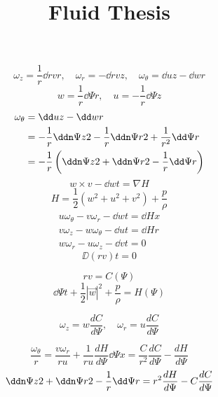 \documentclass{/home/janmebows/Documents/LatexTemplates/myassignment}
\title{Fluid Thesis}
\begin{document}
\[\omega_z = \frac1r \dd{rv}{r}, \quad \omega_r = -\dd{rv}{z},\quad \omega_\theta = \dd{u}{z} - \dd{w}{r}\]
\[w =\frac1r \dd\Psi{r} , \quad u=-\frac1r \dd\Psi{z}\]
\begin{align*}
    \omega_\theta &= \dd uz - \dd wr\\
    &= -\frac1r \ddn\Psi z2 - \frac1r \ddn \Psi r2 + \frac{1}{r^2} \dd\Psi r\\
    &= -\frac1r\left(\ddn\Psi z2 + \ddn \Psi r2 - \frac1r\dd\Psi r\right)
\end{align*}
\[w \times v - \dd wt = \nabla H\]
\[H = \frac12 (w^2 + u^2 + v^2) + \frac p\rho \]
\begin{align*}
    u\omega_\theta - v\omega_r - \dd wt = \dd Hx\\
    v \omega_z - w \omega_\theta - \dd ut = \dd Hr\\
    w\omega_r - u \omega_z - \dd vt = 0
\end{align*}
\[\DD{(rv)}{t} = 0\]

\[rv = C(\Psi)\]
\[\dd{\Psi}{t} + \frac12 |\vec w|^2 + \frac{p}{\rho} = H(\Psi)\]

\[\omega_z = w \frac{dC}{d\Psi}, \quad \omega_r = u \frac{dC}{d\Psi}\]


\[\frac{\omega_\theta}{r} = \frac{v\omega_r}{ru} + \frac1{ru}\frac{dH}{d\Psi} \dd\Psi x = \frac{C}{r^2} \frac{dC}{d\Psi} - \frac{dH}{d\Psi}\]
\[\ddn \Psi z 2 + \ddn \Psi r2 - \frac1r \dd\Psi r= r^2 \frac{dH}{d\Psi} - C\frac{dC}{d\Psi}\]
\end{document}
